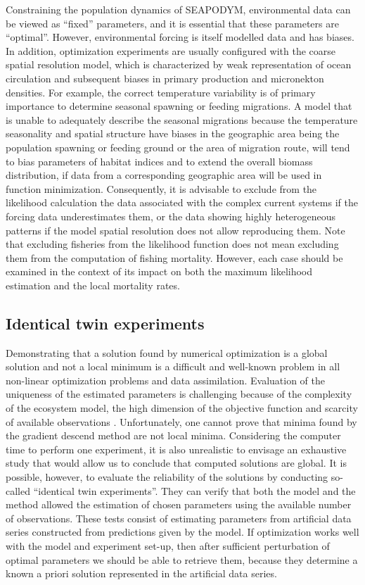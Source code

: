 Constraining the population dynamics of SEAPODYM, environmental data can be viewed as ``fixed'' parameters, and it is essential that these parameters are ``optimal''. However, environmental forcing is itself modelled data and has biases. In addition, optimization experiments are usually configured with the coarse spatial resolution model, which is characterized by weak representation of ocean circulation and subsequent biases in primary production and micronekton densities. For example, the correct temperature variability is of primary importance to determine seasonal spawning or feeding migrations. A model that is unable to adequately describe the seasonal migrations because the temperature seasonality and spatial structure have biases in the geographic area being the population spawning or feeding ground or the area of migration route, will tend to bias parameters of habitat indices and to extend the overall biomass distribution, if data from a corresponding geographic area will be used in function minimization. Consequently, it is advisable to exclude from the likelihood calculation the data associated with the complex current systems if the forcing data underestimates them, or the data showing highly heterogeneous patterns if the model spatial resolution does not allow reproducing them. Note that excluding fisheries from the likelihood function does not mean excluding them from the computation of fishing mortality. However, each case should be examined in the context of its impact on both the maximum likelihood estimation and the local mortality rates. 

\subsection{Identical twin experiments}\label{sec:twin-experiments}

Demonstrating that a solution found by numerical optimization is a global solution and not a local minimum is a difficult and well-known problem in all non-linear optimization problems and data assimilation. Evaluation of the uniqueness of the estimated parameters is challenging because of the complexity of the ecosystem model, the high dimension of the objective function and scarcity of available observations \citep{Robinson,Vallino}. Unfortunately, one cannot prove that minima found by the gradient descend method are not local minima. Considering the computer time to perform one experiment, it is also unrealistic to envisage an exhaustive study that would allow us to conclude that computed solutions are global. It is possible, however, to evaluate the reliability of the solutions by conducting so-called ``identical twin experiments''. They can  verify that both the model and the method allowed the estimation of chosen parameters using the available number of observations. These tests consist of estimating parameters from artificial data series constructed from predictions given by the model. If optimization works well with the model and experiment set-up, then after sufficient perturbation of optimal parameters we should be able to retrieve them, because they determine a known a priori solution represented in the artificial data series. 

